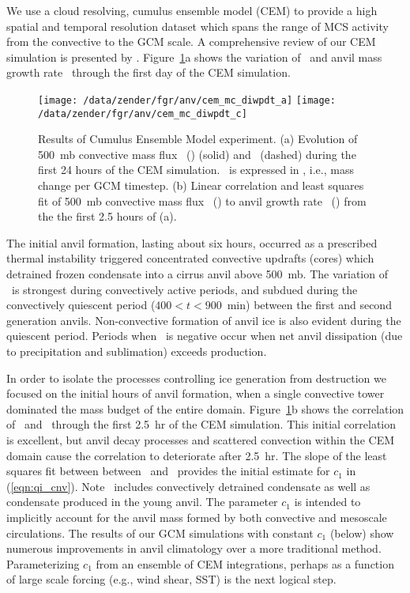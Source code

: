 \documentclass[twoside,agupp]{aguplus}
\begin{document}
We use a cloud resolving, cumulus ensemble model (CEM) to provide a
high spatial and temporal resolution dataset which spans the range of
MCS activity from the convective to the GCM scale.
A comprehensive review of our CEM simulation is presented by
\cite{GMK96}.  
Figure~\ref{fig:mc}a shows the variation of \Mc\ and anvil mass
growth rate \IWPdot\ through the first day of the CEM simulation.
\begin{figure}
\begin{center}
\texttt{[image: /data/zender/fgr/anv/cem\_mc\_diwpdt\_a]}\vfill
\texttt{[image: /data/zender/fgr/anv/cem\_mc\_diwpdt\_c]}\vfill
\end{center}
\caption{
Results of Cumulus Ensemble Model experiment.
(a) Evolution of 500~mb convective mass flux \Mc\ (\gxmS) (solid) and
\IWPdot\ (dashed) during the first 24 hours of the CEM simulation. 
\IWPdot\ is expressed in \gxmSgcmt, i.e., mass change per GCM
timestep.  
(b) Linear correlation and least squares fit of 500~mb convective mass
flux \Mc\ (\gxmSs) to anvil growth rate \IWPdot\ (\gxmSgcmt) from the
the first 2.5 hours of (a).
\label{fig:mc}}
\end{figure}
The initial anvil formation, lasting about six hours, occurred as a
prescribed thermal instability triggered concentrated convective
updrafts (cores) which detrained frozen condensate into a cirrus anvil
above 500~mb.
The variation of \IWPdot\ is strongest during convectively
active periods, and subdued during the convectively quiescent period
($400 < t < 900$~min) between the first and second generation anvils. 
Non-convective formation of anvil ice is also evident during the
quiescent period. 
Periods when \IWPdot\ is negative occur when net anvil dissipation
(due to precipitation and sublimation) exceeds production. 

In order to isolate the processes controlling ice generation
from destruction we focused on the initial hours of anvil formation,
when a single convective tower dominated the mass budget of the entire
domain. 
Figure~\ref{fig:mc}b shows the correlation of \Mc\ and \IWPdot\
through the first 2.5~hr of the CEM simulation. 
This initial correlation is excellent, but anvil decay processes and
scattered convection within the CEM domain cause the correlation to
deteriorate after 2.5~hr.
The slope of the least squares fit between between \Mc\ and \IWPdot\  
provides the initial estimate for $c_1$ in (\ref{eqn:qi_cnv}).
Note \IWPdot\ includes convectively detrained condensate as well as
condensate produced in the young anvil.
The parameter $c_1$ is intended to implicitly account for the anvil
mass formed by both convective and mesoscale circulations.
The results of our GCM simulations with constant $c_1$ (below) show
numerous improvements in anvil climatology over a more traditional
method. 
Parameterizing $c_1$ from an ensemble of CEM integrations, perhaps as
a function of large scale forcing (e.g., wind shear, SST) is the next
logical step.
\end{document}
